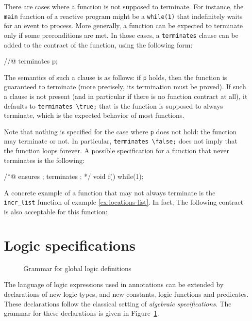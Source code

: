 There are cases where a function is not supposed to terminate. For
instance, the \lstinline|main| function of a reactive program might be a
\lstinline|while(1)| that indefinitely waits for an event to process. More
generally, a function can be expected to terminate only if some
preconditions are met. In those cases, a \lstinline|terminates| clause can
be added to the contract of the function, using the following form:

\begin{listing-nonumber}
//@ terminates p;
\end{listing-nonumber}

The semantics of such a clause is as follows: if \lstinline|p| holds, then the
function is guaranteed to terminate (more precisely, its
termination must be proved). If such a clause is not present (and in
particular if there is no function contract at all), it
defaults to \lstinline|terminates \true;| that is the function is supposed
to always terminate, which is the expected behavior of most
functions.

Note that nothing is specified for the case where \lstinline|p| does not hold:
the function may terminate or not. In particular,
\lstinline|terminates \false;| does not imply that the function loops
forever. A possible specification for a function that never terminates
is the following:
\begin{listing}{1}
/*@ ensures \false;
    terminates \false;
*/
void f() { while(1); }
\end{listing}

\begin{example}
  A concrete example of a function that may not always terminate is
  the \lstinline|incr_list| function of example \ref{ex:locations-list}. In
  fact, The following contract is also acceptable for this function:
\end{example}

\section{Logic specifications}
\label{sec:logicspec}
\begin{figure}[t]
  \begin{cadre}\vfill 
    \vfill\end{cadre}
  \caption{Grammar for global logic definitions}
\label{fig:gram:logic}
\end{figure}
The language of logic expressions used in annotations can be extended
by declarations of new logic types, and new constants, logic functions
and predicates. These declarations follow the classical setting of
\emph{algebraic specifications}.
The grammar for these declarations is given in Figure~\ref{fig:gram:logic}.

